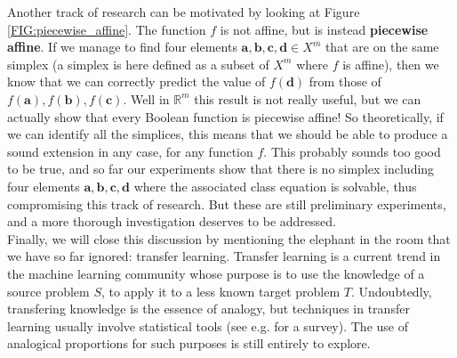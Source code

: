 Another track of research can be motivated by looking at Figure
\ref{FIG:piecewise_affine}. The function $f$ is not affine, but is instead
\textbf{piecewise affine}. If we manage to find four elements $\mathbf{a},
\mathbf{b}, \mathbf{c}, \mathbf{d} \in X^m$ that are on the same simplex (a
simplex is here defined as a subset of $X^m$ where $f$ is affine), then we know
that we can correctly predict the value of $f(\mathbf{d})$ from those of
$f(\mathbf{a}), f(\mathbf{b}), f(\mathbf{c})$. Well in $\mathbb{R}^m$ this
result is not really useful, but we can actually show that every Boolean
function is piecewise affine! So theoretically, if we can identify all the
simplices, this means that we should be able to produce a sound extension in any
case, for any function $f$. This probably sounds too good to be true, and so
far our experiments show that there is no simplex including four elements
$\mathbf{a}, \mathbf{b}, \mathbf{c}, \mathbf{d}$ where the associated class
equation is solvable, thus compromising this track of research. But these are
still preliminary experiments, and a more thorough investigation deserves to be
addressed.\\

Finally, we will close this discussion by mentioning the elephant in the room
that we have so far ignored: transfer learning. Transfer learning is a current
trend in the machine learning community whose purpose is to use the knowledge
of a source problem $S$, to apply it to a less known target problem $T$.
Undoubtedly, transfering knowledge is the essence of analogy, but techniques in
transfer learning usually involve statistical tools (see e.g.
\cite{PanYanTKDE10} for a survey). The use of analogical proportions for such
purposes is still entirely to explore.
